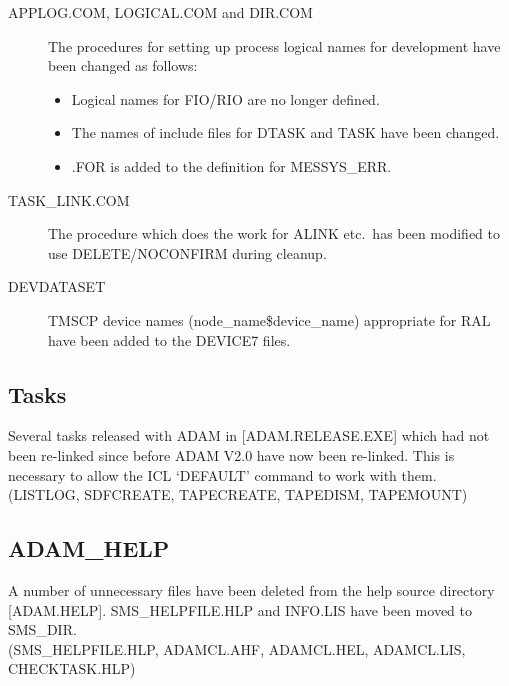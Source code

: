 \begin{description}
\item[APPLOG.COM, LOGICAL.COM and DIR.COM]
The procedures for setting up process logical names for development have been
changed as follows:
\begin{itemize}
\item Logical names for FIO/RIO are no longer defined.
\item The names of include files for DTASK and TASK have been changed.
\item .FOR is added to the definition for MESSYS\_ERR.
\end{itemize}
\item[TASK\_LINK.COM] The procedure which does the work for ALINK etc.\ has been
modified to use DELETE/NOCONFIRM during cleanup.
\item[DEVDATASET] TMSCP device names (node\_name\$device\_name) appropriate for
RAL have been added to the DEVICE7 files.
\end{description}

\subsection{Tasks}
Several tasks released with ADAM in [ADAM.RELEASE.EXE] which had not been
re-linked since before ADAM V2.0 have now been re-linked. This is necessary to
allow the ICL `DEFAULT' command to work with them.\\
(LISTLOG, SDFCREATE, TAPECREATE, TAPEDISM, TAPEMOUNT)

\subsection{ADAM\_HELP}
A number of unnecessary files have been deleted from the help source directory 
[ADAM.HELP]. SMS\_HELPFILE.HLP and INFO.LIS have been moved to SMS\_DIR.\\
(SMS\_HELPFILE.HLP, ADAMCL.AHF, ADAMCL.HEL, ADAMCL.LIS, CHECKTASK.HLP)


